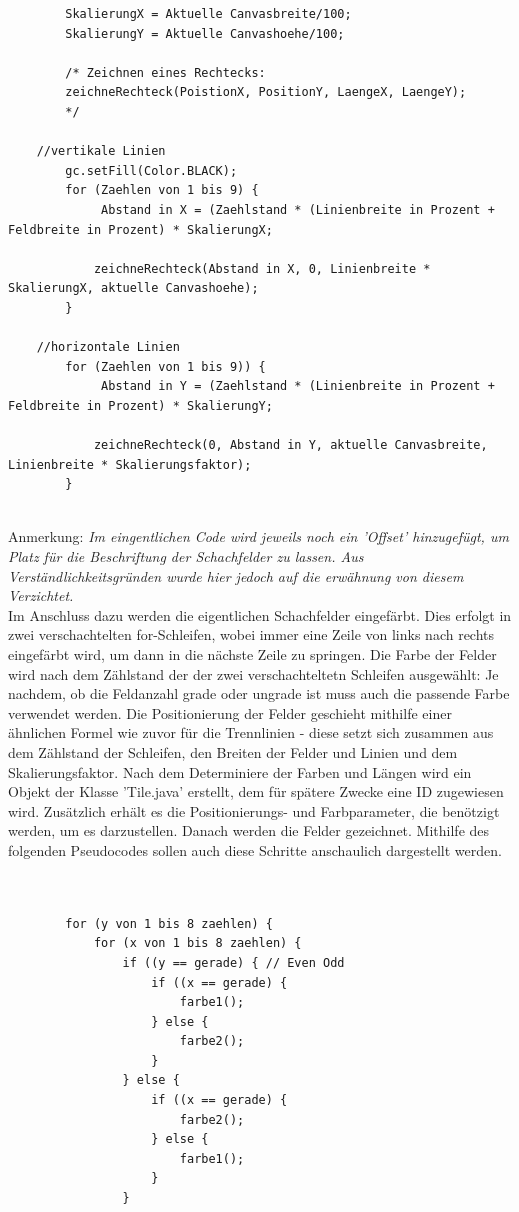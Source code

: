 \documentclass[12pt,a4paper]{article}
\begin{document}
{\begin{lstlisting}
		SkalierungX = Aktuelle Canvasbreite/100;
		SkalierungY = Aktuelle Canvashoehe/100;
		
		/* Zeichnen eines Rechtecks: 
		zeichneRechteck(PoistionX, PositionY, LaengeX, LaengeY);
		*/
	
	//vertikale Linien
		gc.setFill(Color.BLACK);
		for (Zaehlen von 1 bis 9) {
			 Abstand in X = (Zaehlstand * (Linienbreite in Prozent + Feldbreite in Prozent) * SkalierungX;
			 
			zeichneRechteck(Abstand in X, 0, Linienbreite * SkalierungX, aktuelle Canvashoehe);
		}

	//horizontale Linien		
		for (Zaehlen von 1 bis 9)) {
			 Abstand in Y = (Zaehlstand * (Linienbreite in Prozent + Feldbreite in Prozent) * SkalierungY;
			 
			zeichneRechteck(0, Abstand in Y, aktuelle Canvasbreite, Linienbreite * Skalierungsfaktor);
		}
		
\end{lstlisting}
Anmerkung: \textit{Im eingentlichen Code wird jeweils noch ein 'Offset' hinzugefügt, um Platz für die Beschriftung der Schachfelder zu lassen. Aus Verständlichkeitsgründen wurde hier jedoch auf die erwähnung von diesem Verzichtet.} \\[2ex]
Im Anschluss dazu werden die eigentlichen Schachfelder eingefärbt. Dies erfolgt in zwei verschachtelten for-Schleifen, wobei immer eine Zeile von links nach rechts eingefärbt wird, um dann in die nächste Zeile zu springen. Die Farbe der Felder wird nach dem Zählstand der der zwei verschachteltetn Schleifen ausgewählt: Je nachdem, ob die Feldanzahl grade oder ungrade ist muss auch die passende Farbe verwendet werden. Die Positionierung der Felder geschieht mithilfe einer ähnlichen Formel wie zuvor für die Trennlinien - diese setzt sich zusammen aus dem Zählstand der Schleifen, den Breiten der Felder und Linien und dem Skalierungsfaktor. Nach dem Determiniere der Farben und Längen wird ein Objekt der Klasse 'Tile.java' erstellt, dem für spätere Zwecke eine ID zugewiesen wird. Zusätzlich erhält es die Positionierungs- und Farbparameter, die benötzigt werden, um es darzustellen. Danach werden die Felder gezeichnet. 
Mithilfe des folgenden Pseudocodes sollen auch diese Schritte anschaulich dargestellt werden.
\lstset{language=java}
\begin{lstlisting}

	
		for (y von 1 bis 8 zaehlen) {
			for (x von 1 bis 8 zaehlen) {
				if ((y == gerade) { // Even Odd
					if ((x == gerade) {
						farbe1();
					} else {
						farbe2();
					}
				} else {
					if ((x == gerade) {
						farbe2();
					} else {
						farbe1();
					}
				}
				

\end{lstlisting}}
\end{document}
